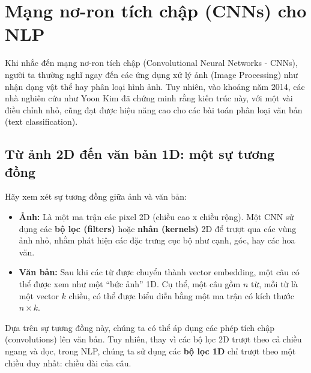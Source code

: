 
\section{Mạng nơ-ron tích chập (CNNs) cho NLP}
\label{sec:cnn_for_nlp}

Khi nhắc đến mạng nơ-ron tích chập (Convolutional Neural Networks - CNNs), người ta thường nghĩ ngay đến các ứng dụng xử lý ảnh (Image Processing) như nhận dạng vật thể hay phân loại hình ảnh. Tuy nhiên, vào khoảng năm 2014, các nhà nghiên cứu như Yoon Kim \cite{kim2014convolutional} đã chứng minh rằng kiến trúc này, với một vài điều chỉnh nhỏ, cũng đạt được hiệu năng cao cho các bài toán phân loại văn bản (text classification).

\subsection{Từ ảnh 2D đến văn bản 1D: một sự tương đồng}
\label{ssec:cnn_analogy}

Hãy xem xét sự tương đồng giữa ảnh và văn bản:
\begin{itemize}
    \item \textbf{Ảnh:} Là một ma trận các pixel 2D (chiều cao x chiều rộng). Một CNN sử dụng các \textbf{bộ lọc (filters)} hoặc \textbf{nhân (kernels)} 2D để trượt qua các vùng ảnh nhỏ, nhằm phát hiện các đặc trưng cục bộ như cạnh, góc, hay các hoa văn.
    \item \textbf{Văn bản:} Sau khi các từ được chuyển thành vector embedding, một câu có thể được xem như một “bức ảnh” 1D. Cụ thể, một câu gồm $n$ từ, mỗi từ là một vector $k$ chiều, có thể được biểu diễn bằng một ma trận có kích thước $n \times k$.
\end{itemize}

Dựa trên sự tương đồng này, chúng ta có thể áp dụng các phép tích chập (convolutions) lên văn bản. Tuy nhiên, thay vì các bộ lọc 2D trượt theo cả chiều ngang và dọc, trong NLP, chúng ta sử dụng các \textbf{bộ lọc 1D} chỉ trượt theo một chiều duy nhất: chiều dài của câu.

\begin{center}
    \label{fig:cnn_nlp_architecture}
\end{center}

